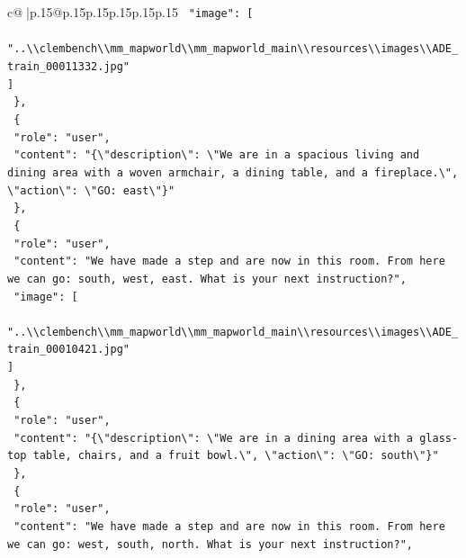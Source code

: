 \documentclass{article}
\begin{document}
{\begin{supertabular}{c@{$\;$}|p{.15\linewidth}@{}p{.15\linewidth}p{.15\linewidth}p{.15\linewidth}p{.15\linewidth}p{.15\linewidth}}
{{{\texttt{    "image": {[}} \\
\texttt{      "..\textbackslash{}\textbackslash{}clembench\textbackslash{}\textbackslash{}mm\_mapworld\textbackslash{}\textbackslash{}mm\_mapworld\_main\textbackslash{}\textbackslash{}resources\textbackslash{}\textbackslash{}images\textbackslash{}\textbackslash{}ADE\_train\_00011332.jpg"} \\
\texttt{    {]}} \\
\texttt{  \},} \\
\texttt{  \{} \\
\texttt{    "role": "user",} \\
\texttt{    "content": "\{\textbackslash{}"description\textbackslash{}": \textbackslash{}"We are in a spacious living and dining area with a woven armchair, a dining table, and a fireplace.\textbackslash{}", \textbackslash{}"action\textbackslash{}": \textbackslash{}"GO: east\textbackslash{}"\}"} \\
\texttt{  \},} \\
\texttt{  \{} \\
\texttt{    "role": "user",} \\
\texttt{    "content": "We have made a step and are now in this room. From here we can go: south, west, east. What is your next instruction?",} \\
\texttt{    "image": {[}} \\
\texttt{      "..\textbackslash{}\textbackslash{}clembench\textbackslash{}\textbackslash{}mm\_mapworld\textbackslash{}\textbackslash{}mm\_mapworld\_main\textbackslash{}\textbackslash{}resources\textbackslash{}\textbackslash{}images\textbackslash{}\textbackslash{}ADE\_train\_00010421.jpg"} \\
\texttt{    {]}} \\
\texttt{  \},} \\
\texttt{  \{} \\
\texttt{    "role": "user",} \\
\texttt{    "content": "\{\textbackslash{}"description\textbackslash{}": \textbackslash{}"We are in a dining area with a glass{-}top table, chairs, and a fruit bowl.\textbackslash{}", \textbackslash{}"action\textbackslash{}": \textbackslash{}"GO: south\textbackslash{}"\}"} \\
\texttt{  \},} \\
\texttt{  \{} \\
\texttt{    "role": "user",} \\
\texttt{    "content": "We have made a step and are now in this room. From here we can go: west, south, north. What is your next instruction?",} \\
}}}
\end{supertabular}}
\end{document}
